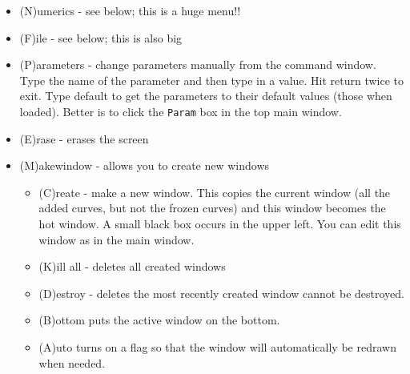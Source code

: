 \documentclass{article}
\begin{document}
\begin{itemize}
\begin{itemize}
\begin{itemize}
\end{itemize}
\item (A)xes options - Brings up a dialog. You can set the positions of the axes (thin dotted lines) and whether they appear or not and the postscript font size.
\item exp(O)rt data - save all the primary curves (those that you have added with (A)dd curve) into a text file that is space delimited. First column is the x-axis and the others are the y-axes for the  viewed curves. In 3D mode, all three columns are saved. 
\item (C)olormap - select the colormap that is used in the animator, the colorize options, and the array plot. There are 7 of them. {\tt Normal} is like the {\tt jet in matlab}. 
\end{itemize}
\item (N)umerics - see below; this is a huge menu!!
\item (F)ile - see below; this is also big
\item (P)arameters - change parameters manually from the command window. Type the name of the parameter and then type in a value. Hit return twice to exit. Type default to get the parameters to their default values (those when loaded). Better is to click the {\tt Param} box in the top main window. 
\item (E)rase - erases the screen
\item (M)akewindow - allows you to create new windows
\begin{itemize}
\item (C)reate - make a new window. This copies the current window (all the added curves, but not the frozen curves) and this window becomes the hot window. A small black box occurs in the upper left. You can edit this window as in the main window. 
\item (K)ill all - deletes all created windows
\item (D)estroy - deletes the most recently created window
 cannot be destroyed.  
\item (B)ottom puts the active window on the bottom. 
\item (A)uto turns on a flag so that the window will automatically be
redrawn when needed.


\end{itemize}
\end{itemize}
\end{document}
